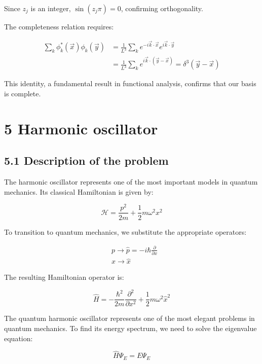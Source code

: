 \documentclass[italian]{HKNdocument}
\begin{document}
Since $z_j$ is an integer, $\sin(z_j\pi) = 0$, confirming orthogonality.

The completeness relation requires:

\begin{align*}
\sum_k \phi_k^*(\vec{x})\phi_k(\vec{y}) &= \frac{1}{L^3}\sum_k e^{-i\vec{k}\cdot\vec{x}}e^{i\vec{k}\cdot\vec{y}} \\
&= \frac{1}{L^3}\sum_k e^{i\vec{k}\cdot(\vec{y}-\vec{x})} = \delta^3(\vec{y}-\vec{x}) \tag{4.41}
\end{align*}

This identity, a fundamental result in functional analysis, confirms that our basis is complete.

\section*{5 Harmonic oscillator}
\subsection*{5.1 Description of the problem}

The harmonic oscillator represents one of the most important models in quantum mechanics. Its classical Hamiltonian is given by:

\begin{equation*}
\mathcal{H} = \frac{p^2}{2m} + \frac{1}{2}m\omega^2 x^2 \tag{5.1}
\end{equation*}

To transition to quantum mechanics, we substitute the appropriate operators:

\begin{align*}
&p \longrightarrow \hat{p} = -i\hbar\frac{\partial}{\partial x} \tag{5.2} \\
&x \longrightarrow \hat{x}
\end{align*}

The resulting Hamiltonian operator is:


\begin{equation*}
\hat{H} = -\frac{\hbar^2}{2m}\frac{\partial^2}{\partial x^2} + \frac{1}{2}m\omega^2\hat{x}^2 \tag{5.3}
\end{equation*}

The quantum harmonic oscillator represents one of the most elegant problems in quantum mechanics. To find its energy spectrum, we need to solve the eigenvalue equation:

\begin{equation*}
\hat{H}\Psi_E = E\Psi_E \tag{5.4}
\end{equation*}
\end{document}
